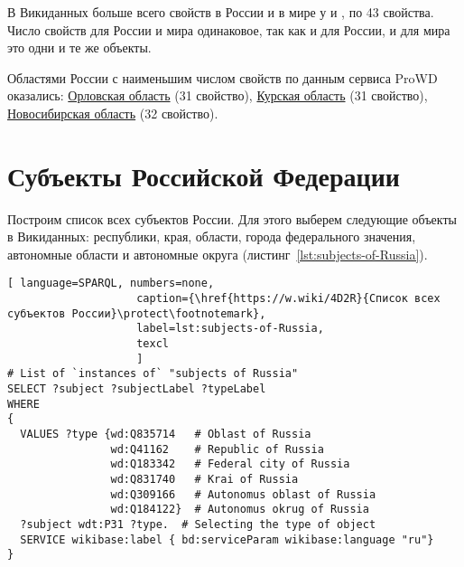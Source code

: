 В Викиданных больше всего свойств в России и в мире у  и , по 43 свойства\autocite{Russia_prowd}. Число свойств для России и мира одинаковое, так как и для России, и для мира это одни и те же объекты.

Областями России с наименьшим числом свойств по данным сервиса ProWD оказались: \href{http://www.wikidata.org/entity/Q3129}{Орловская область} (31 свойство), \href{http://www.wikidata.org/entity/Q3178}{Курская область} (31 свойство), \href{http://www.wikidata.org/entity/Q5851}{Новосибирская область} (32 свойство).

\section{Субъекты Российской Федерации}

Построим список всех субъектов России. Для этого выберем следующие объекты в Викиданных: республики, края, области, города федерального значения, автономные области и автономные округа (листинг~\protect\ref{lst:subjects-of-Russia}).


\begin{lstlisting}[ language=SPARQL, numbers=none,
                    caption={\href{https://w.wiki/4D2R}{Список всех субъектов России}\protect\footnotemark},
                    label=lst:subjects-of-Russia,
                    texcl 
                    ]
# List of `instances of` "subjects of Russia" 
SELECT ?subject ?subjectLabel ?typeLabel
WHERE
{  
  VALUES ?type {wd:Q835714   # Oblast of Russia
                wd:Q41162    # Republic of Russia
                wd:Q183342   # Federal city of Russia
                wd:Q831740   # Krai of Russia
                wd:Q309166   # Autonomus oblast of Russia
                wd:Q184122}  # Autonomus okrug of Russia
  ?subject wdt:P31 ?type.  # Selecting the type of object
  SERVICE wikibase:label { bd:serviceParam wikibase:language "ru"}
}
\end{lstlisting}%

